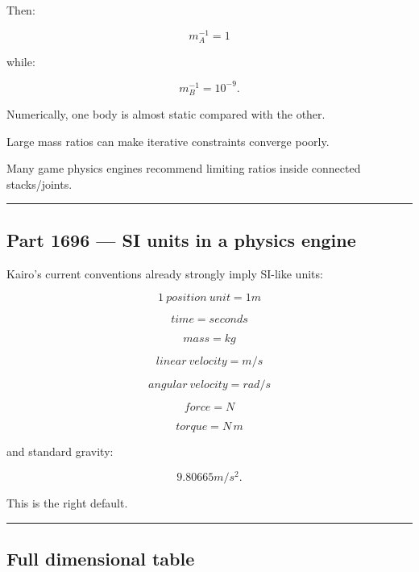Then:

\[
m_A^{-1}=1
\]

while:

\[
m_B^{-1}=10^{-9}.
\]

Numerically, one body is almost static compared with the other.

Large mass ratios can make iterative constraints converge poorly.

Many game physics engines recommend limiting ratios inside connected stacks/joints.

\begin{center}\rule{0.5\linewidth}{0.5pt}\end{center}

\subsection{Part 1696 --- SI units in a physics engine}\label{06-engine-ii-ch039-part-1696-si-units-in-a-physics-engine}

\hypertarget{06-engine-ii-ch039-part-1696-si-units-in-a-physics-engine}{}

Kairo's current conventions already strongly imply SI-like units:

\[
\boxed{
1\ position\ unit=1m
}
\]

\[
\boxed{
time=seconds
}
\]

\[
\boxed{
mass=kg
}
\]

\[
\boxed{
linear\ velocity=m/s
}
\]

\[
\boxed{
angular\ velocity=rad/s
}
\]

\[
\boxed{
force=N
}
\]

\[
\boxed{
torque=N\,m
}
\]

and standard gravity:

\[
9.80665m/s^2.
\]

This is the right default.

\begin{center}\rule{0.5\linewidth}{0.5pt}\end{center}

\subsection{Full dimensional table}\label{06-engine-ii-ch039-full-dimensional-table}

\hypertarget{06-engine-ii-ch039-full-dimensional-table}{}

